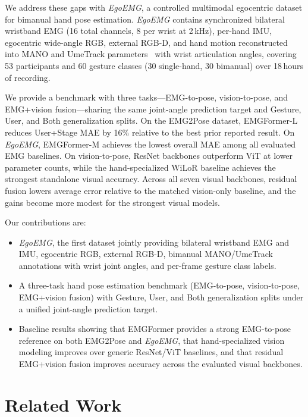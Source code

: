 \documentclass[letterpaper]{article} %
\newcommand{\dataset}{\textit{EgoEMG}}
\newcommand{\model}{EMGFormer}
\begin{document}
We address these gaps with \dataset{}, a controlled multimodal egocentric dataset for bimanual hand pose estimation. \dataset{} contains synchronized bilateral wristband EMG (16 total channels, 8 per wrist at 2\,kHz), per-hand IMU, egocentric wide-angle RGB, external RGB-D, and hand motion reconstructed into MANO and UmeTrack parameters~\citep{mano,umetrack} with wrist articulation angles, covering 53 participants and 60 gesture classes (30 single-hand, 30 bimanual) over 18\,hours of recording.

We provide a benchmark with three tasks---EMG-to-pose, vision-to-pose, and EMG+vision fusion---sharing the same joint-angle prediction target and Gesture, User, and Both generalization splits. On the EMG2Pose dataset, \model{}-L reduces User+Stage MAE by 16\% relative to the best prior reported result. On \dataset{}, \model{}-M achieves the lowest overall MAE among all evaluated EMG baselines. On vision-to-pose, ResNet backbones outperform ViT at lower parameter counts, while the hand-specialized WiLoR baseline achieves the strongest standalone visual accuracy. Across all seven visual backbones, residual fusion lowers average error relative to the matched vision-only baseline, and the gains become more modest for the strongest visual models.

Our contributions are:
\begin{itemize}[leftmargin=1.5em,nosep]
    \item \dataset{}, the first dataset jointly providing bilateral wristband EMG and IMU, egocentric RGB, external RGB-D, bimanual MANO/UmeTrack annotations with wrist joint angles, and per-frame gesture class labels.
    \item A three-task hand pose estimation benchmark (EMG-to-pose, vision-to-pose, EMG+vision fusion) with Gesture, User, and Both generalization splits under a unified joint-angle prediction target.
    \item Baseline results showing that \model{} provides a strong EMG-to-pose reference on both EMG2Pose and \dataset{}, that hand-specialized vision modeling improves over generic ResNet/ViT baselines, and that residual EMG+vision fusion improves accuracy across the evaluated visual backbones.
\end{itemize}  

\section{Related Work}
\end{document}
